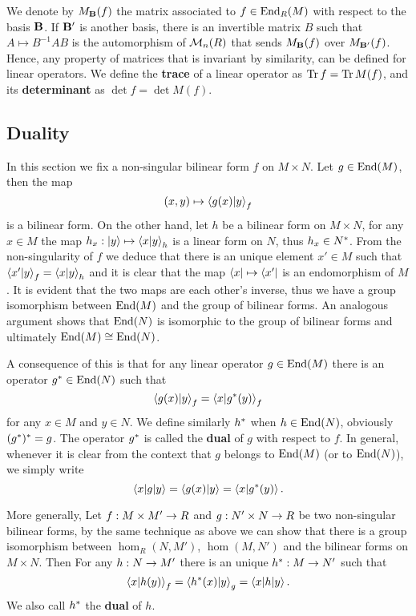 We denote by $M_{\mathbf{B}}(f)$ the matrix associated to
$f\in\operatorname{End}_R(M)$ with respect to the basis $\mathbf{B}$.  If
$\mathbf{B'}$ is another basis, there is an invertible matrix $B$ such
that $A\mapsto B^{-1}AB$ is the automorphism of $\operatorname{\mathcal{M}}_n(R)$ that sends
$M_{\mathbf{B}}(f)$ over $M_{\mathbf{B'}}(f)$. Hence, any property of
matrices that is invariant by similarity, can be defined for linear
operators. We define the 
\textbf{trace} of a linear operator as $\operatorname{Tr} f = \operatorname{Tr}
M(f)$, and its \textbf{determinant} as $\det f =
\det M(f)$.


\subsection{Duality}
\label{sec:linear-algebra:duality}
In this section we fix a non-singular bilinear form $f$ on $M\times
N$. Let $g\in\operatorname{End}(M)$, then the map
\[(x,y) \mapsto \left\langle g(x) \middle| y \right\rangle_f\] is a bilinear
form. On the other hand, let $h$ be a bilinear form on $M\times N$,
for any $x\in M$ the map $h_x : \left\lvert y \right\rangle \mapsto \left\langle x \middle| y \right\rangle_h$
is a linear form on $N$, thus $h_x\in N^\ast$. From the
non-singularity of $f$ we deduce that there is an unique element
$x'\in M$ such that $\left\langle x' \middle| y \right\rangle_f=\left\langle x \middle| y \right\rangle_h$ and it is
clear that the map $\left\langle x \right\rvert\mapsto \left\langle x' \right\rvert$ is an endomorphism of
$M$. It is evident that the two maps are each other's inverse, thus we
have a group isomorphism between $\operatorname{End}(M)$ and the group of bilinear
forms. An analogous argument shows that $\operatorname{End}(N)$ is isomorphic to the
group of bilinear forms and ultimately $\operatorname{End}(M)\cong\operatorname{End}(N)$.

A consequence of this is that for any linear operator $g\in\operatorname{End}(M)$
there is an operator $g^\ast\in\operatorname{End}(N)$ such that
\[\left\langle g(x) \middle| y \right\rangle_f = \left\langle x \middle| g^\ast(y) \right\rangle_f\]
for any $x\in M$ and $y\in N$. We define similarly $h^\ast$ when
$h\in\operatorname{End}(N)$, obviously $(g^\ast)^\ast = g$. The operator
$g^\ast$ is called the \textbf{dual} of $g$
with respect to $f$. In general, whenever it is clear from the context
that $g$ belongs to $\operatorname{End}(M)$ (or to $\operatorname{End}(N)$), we simply write
\[\left\langle x \middle| g \middle| y \right\rangle = \left\langle g(x) \middle| y \right\rangle = \left\langle x \middle| g^\ast(y) \right\rangle\text{.}\]

More generally, Let $f:M\times M'\rightarrow R$ and $g:N'\times N\rightarrow R$ be two
non-singular bilinear forms, by the same technique as above we can
show that there is a group isomorphism between $\hom_R(N,M')$,
$\hom(M,N')$ and the bilinear forms on $M\times N$. Then For any
$h:N\rightarrow M'$ there is an unique $h^\ast:M\rightarrow N'$ such that
\[\left\langle x \middle| h(y) \right\rangle_f = \left\langle h^\ast(x) \middle| y \right\rangle_g =
\left\langle x \middle| h \middle| y \right\rangle\text{.}\]
We also call $h^\ast$ the \textbf{dual} of $h$.

